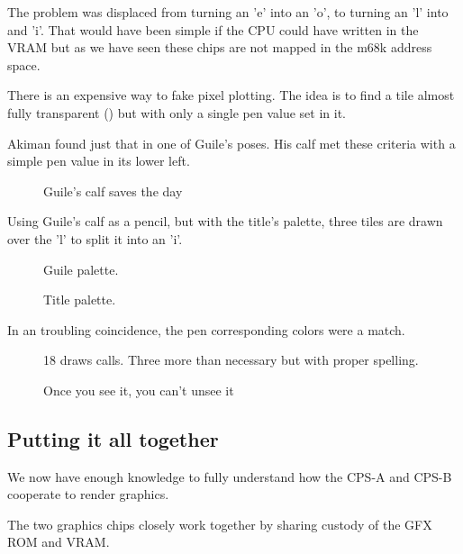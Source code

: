 The problem was displaced from turning an 'e' into an 'o', to turning an 'l' into and 'i'. That would have been simple if the CPU could have written in the VRAM but as we have seen these chips are not mapped in the m68k address space.

There is an expensive way to fake pixel plotting. The idea is to find a tile almost fully transparent () but with only a single pen value set in it. 

Akiman found just that in one of Guile's poses. His calf met these criteria with a simple pen value in its lower left.

\begin{figure}[H]
\caption*{Guile's calf saves the day}%
 \end{figure}%

Using Guile's calf as a pencil, but with the title's palette, three tiles are drawn over the 'l' to split it into an 'i'.

\begin{figure}[H]
 \caption*{Guile palette.}%
 \end{figure}%

 \begin{figure}[H]
 \caption*{Title palette.}%
 \end{figure}%


 In an troubling coincidence, the pen corresponding colors were a match.

\begin{figure}[H]
 \caption*{18 draws calls. Three more than necessary but with proper spelling.}%
 \end{figure}%

\begin{figure}[H]
 \caption*{Once you see it, you can't unsee it}%
 \end{figure}%



\subsection{Putting it all together}

We now have enough knowledge to fully understand how the CPS-A and CPS-B cooperate to render graphics.

The two graphics chips closely work together by sharing custody of the GFX ROM and VRAM. 


